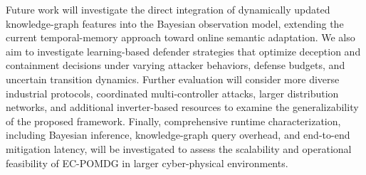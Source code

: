 \documentclass[10pt,conference]{IEEEtran}
\begin{document}
Future work will investigate the direct integration of dynamically updated knowledge-graph features into the Bayesian observation model, extending the current temporal-memory approach toward online semantic adaptation. We also aim to investigate learning-based defender strategies that optimize deception and containment decisions under varying attacker behaviors, defense budgets, and uncertain transition dynamics. Further evaluation will consider more diverse industrial protocols, coordinated multi-controller attacks, larger distribution networks, and additional inverter-based resources to examine the generalizability of the proposed framework. Finally, comprehensive runtime characterization, including Bayesian inference, knowledge-graph query overhead, and end-to-end mitigation latency, will be investigated to assess the scalability and operational feasibility of EC-POMDG in larger cyber-physical environments.




\end{document}
